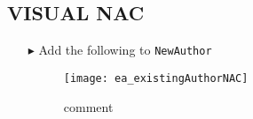 \hypertarget{NAC vis}{}
\subsection{VISUAL NAC}
\texHeader

\begin{itemize}

\item[$\blacktriangleright$] Add the following to \texttt{NewAuthor}

\begin{figure}[htbp]
\begin{center}
  \texttt{[image: ea\_existingAuthorNAC]}
  \caption{comment}
  \label{ea:existingAuthorNAC}
\end{center}
\end{figure}

\end{itemize}
